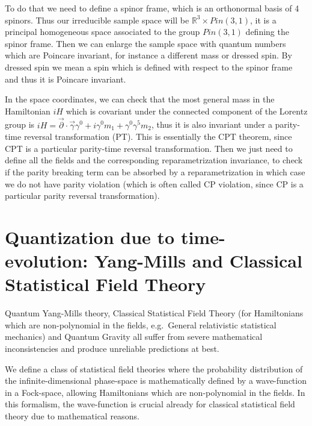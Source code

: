 \documentclass[11pt]{book}
\begin{document}
To do that we need to define a spinor frame, which is an orthonormal
basis of 4 spinors. Thus our irreducible sample space will be
\(\mathbb{R}^3\times Pin(3,1)\), it is a principal homogeneous space
associated to the group \(Pin(3,1)\) defining the spinor frame. Then we
can enlarge the sample space with quantum numbers which are Poincare
invariant, for instance a different mass or dressed spin. By dressed
spin we mean a spin which is defined with respect to the spinor frame
and thus it is Poincare invariant.

In the space coordinates, we can check that the most general mass in the
Hamiltonian \(iH\) which is covariant under the connected component of
the Lorentz group is
\(iH=\vec{\partial}\cdot\vec{\gamma}\gamma^0+ i\gamma^0 m_1+\gamma^0\gamma^5 m_2\),
thus it is also invariant under a parity-time reversal transformation
(PT). This is essentially the CPT theorem, since CPT is a particular
parity-time reversal transformation. Then we just need to define all the
fields and the corresponding reparametrization invariance, to check if
the parity breaking term can be absorbed by a reparametrization in which
case we do not have parity violation (which is often called CP
violation, since CP is a particular parity reversal transformation).

\hypertarget{section:Energy}{%
\section*{}\label{section:Energy}}

\chapter{Quantization due to time-evolution: Yang-Mills and Classical Statistical Field Theory}
Quantum Yang-Mills theory, Classical Statistical Field Theory (for
Hamiltonians which are non-polynomial in the fields, e.g.~General
relativistic statistical mechanics) and Quantum Gravity all suffer from
severe mathematical inconsistencies and produce unreliable predictions
at best.

We define a class of statistical field theories where the probability
distribution of the infinite-dimensional phase-space is mathematically
defined by a wave-function in a Fock-space, allowing Hamiltonians which
are non-polynomial in the fields. In this formalism, the wave-function
is crucial already for classical statistical field theory due to
mathematical reasons.
\end{document}
